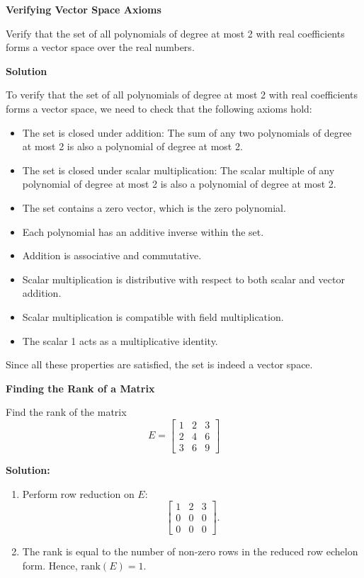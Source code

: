 \documentclass[8pt, a4paper, landscape]{extarticle}
\begin{document}
\begin{multicols*}{5}
  \textbf{Verifying Vector Space Axioms}

  Verify that the set of all polynomials of degree at most 2 with real coefficients forms a vector space over the real numbers.

  \textbf{Solution}

  To verify that the set of all polynomials of degree at most 2 with real coefficients forms a vector space, we need to check that the following axioms hold:
  \begin{itemize}
    \item The set is closed under addition: The sum of any two polynomials of degree at most 2 is also a polynomial of degree at most 2.
    \item The set is closed under scalar multiplication: The scalar multiple of any polynomial of degree at most 2 is also a polynomial of degree at most 2.
    \item The set contains a zero vector, which is the zero polynomial.
    \item Each polynomial has an additive inverse within the set.
    \item Addition is associative and commutative.
    \item Scalar multiplication is distributive with respect to both scalar and vector addition.
    \item Scalar multiplication is compatible with field multiplication.
    \item The scalar 1 acts as a multiplicative identity.
  \end{itemize}
  Since all these properties are satisfied, the set is indeed a vector space.


  \textbf{Finding the Rank of a Matrix}

  Find the rank of the matrix
  \[
    E = \begin{bmatrix} 1 & 2 & 3 \\ 2 & 4 & 6 \\ 3 & 6 & 9 \end{bmatrix}
  \]

  \textbf{Solution:}
  \begin{enumerate}
    \item Perform row reduction on $E$:
          \[
            \begin{bmatrix}
              1 & 2 & 3 \\
              0 & 0 & 0 \\
              0 & 0 & 0
            \end{bmatrix}.
          \]
    \item The rank is equal to the number of non-zero rows in the reduced row echelon form. Hence, $\text{rank}(E) = 1$.
  \end{enumerate}


\end{multicols*}
\end{document}
